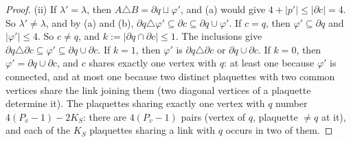 \documentclass[11pt,a4paper]{article}
\theoremstyle{definition}
\theoremstyle{remark}
\begin{document}
\begin{proof}
(ii) If $\lambda'=\lambda$, then $A\triangle B=\partial q\sqcup\varphi'$, and (a) would give $4+|p'|\le|\partial c|=4$. So $\lambda'\ne\lambda$, and by (a) and (b),
$\partial q\triangle\varphi'\subseteq\partial c\subseteq\partial q\cup\varphi'$. If $c=q$, then $\varphi'\subseteq\partial q$ and $|\varphi'|\le4$. So $c\ne q$, and $k:=|\partial q\cap\partial c|\le1$.
The inclusions give $\partial q\triangle\partial c\subseteq\varphi'\subseteq\partial q\cup\partial c$. If $k=1$, then $\varphi'$ is $\partial q\triangle\partial c$ or $\partial q\cup\partial c$. If
$k=0$, then $\varphi'=\partial q\cup\partial c$, and $c$ shares exactly one vertex with $q$: at least one because $\varphi'$ is connected, and at most one because two
distinct plaquettes with two common vertices share the link joining them (two diagonal vertices of a plaquette determine it). The plaquettes sharing exactly one vertex with $q$ number $4(P_v-1)-2K_S$: there are
$4(P_v-1)$ pairs (vertex of $q$, plaquette $\ne q$ at it), and each of the $K_S$ plaquettes sharing a link with $q$ occurs in two of them.


\end{proof}
\end{document}

